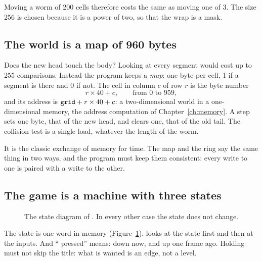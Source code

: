 Moving a worm of 200 cells therefore costs the same as moving one of 3. The
size 256 is chosen because it is a power of two, so that the wrap is a mask.

\subsection{The world is a map of 960 bytes}

Does the new head touch the body? Looking at every segment would cost up to
255 comparisons. Instead the program keeps a \emph{map}: one byte per cell, 1
if a segment is there and 0 if not. The cell in column $c$ of row $r$ is the
byte number
\[ r\times 40+c,\qquad\text{from 0 to 959}, \]
and its address is $\texttt{grid}+r\times 40+c$: a two-dimensional world in a
one-dimensional memory, the address computation of Chapter~\ref{ch:memory}. A
step sets one byte, that of the new head, and clears one, that of the old
tail. The collision test is a single load, whatever the length of the worm.

It is the classic exchange of memory for time. The map and the ring say the
same thing in two ways, and the program must keep them consistent: every write
to one is paired with a write to the other.

\subsection{The game is a machine with three states}

\begin{figure}[htb]
\centering
{}
\caption{The state diagram of \vermone. In every other case the state does not change.}
\label{fig:v3:fsm}
\end{figure}

The state is one word in memory (Figure~\ref{fig:v3:fsm}). 
looks at the state first and then at the inputs. And `` pressed''
means: down now, and up one frame ago. Holding  must not skip the
title: what is wanted is an edge, not a level.

